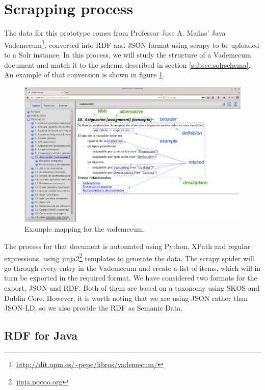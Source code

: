 \section{Scrapping process}
\label{sec:javascrapping}

The data for this prototype comes from Professor Jose A. Mañas' Java Vademecum\footnote{\url{http://dit.upm.es/~pepe/libros/vademecum/}}, converted into \ac{RDF} and JSON format using scrapy to be uploaded to a Solr instance. In this process, we will study the structure of a Vademecum document and match it to the schema described in section \ref{subsec:solrschema}. An example of that conversion is shown in figure \ref{fig:vademecum1}.

\begin{figure}[!htbp]
    \centering
    \includegraphics[width=1.1\textwidth]{img/screens/vademecum-ex.png}
    \caption{Example mapping for the vademecum.}
    \label{fig:vademecum1}
\end{figure}

The process for that document is automated using Python, XPath and regular expressions, using jinja2\footnote{\url{jinja.pocoo.org}} templates to generate the data. The scrapy spider will go through every entry in the Vademecum and create a list of items, which will in turn be exported in the required format. We have considered two formats for the export, JSON and \ac{RDF}. Both of them are based on a taxonomy using SKOS and Dublin Core. However, it is worth noting that we are using JSON rather than JSON-LD, so we also provide the \ac{RDF} as Semanic Data.

\subsection{RDF for Java}

